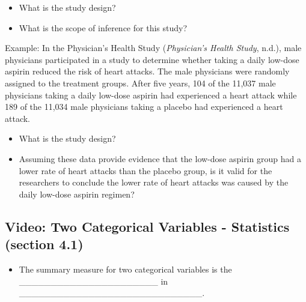 \documentclass[
]{report}
\providecommand{\tightlist}{%
  \setlength{\itemsep}{0pt}\setlength{\parskip}{0pt}}
\begin{document}
\begin{itemize}
\tightlist
\item
  What is the study design?
\end{itemize}

\vspace{0.5in}

\begin{itemize}
\tightlist
\item
  What is the scope of inference for this study?
\end{itemize}

\vspace{0.5in}

Example: In the Physician's Health Study (\emph{Physician's Health Study}, n.d.), male physicians participated in a study to determine whether taking a daily low-dose aspirin reduced the risk of heart attacks. The male physicians were randomly assigned to the treatment groups. After five years, 104 of the 11,037 male physicians taking a daily low-dose aspirin had experienced a heart attack while 189 of the 11,034 male physicians taking a placebo had experienced a heart attack.

\begin{itemize}
\tightlist
\item
  What is the study design?
\end{itemize}

\vspace{0.5in}

\begin{itemize}
\tightlist
\item
  Assuming these data provide evidence that the low-dose aspirin group had a lower rate of heart attacks than the placebo group, is it valid for the researchers to conclude the lower rate of heart attacks was caused by the daily low-dose aspirin regimen?
\end{itemize}

\vspace{0.5in}

\subsection*{Video: Two Categorical Variables - Statistics (section 4.1)}\label{video-two-categorical-variables---statistics-section-4.1}


\begin{itemize}
\tightlist
\item
  The summary measure for two categorical variables is the \_\_\_\_\_\_\_\_\_\_\_\_\_\_\_\_\_\_\_\_\_\_ in \_\_\_\_\_\_\_\_\_\_\_\_\_\_\_\_\_\_\_\_\_\_\_\_\_\_\_\_\_.
\end{itemize}
\end{document}
